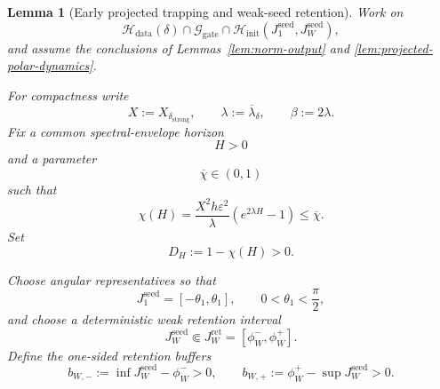 \documentclass{article} %
\theoremstyle{plain}
\newtheorem{lemma}[theorem]{Lemma}
\theoremstyle{definition}
\theoremstyle{remark}
\begin{document}

\begin{lemma}[Early projected trapping and weak-seed retention]
\label{lem:early-projected-trapping}
Work on
\[
\mathcal H_{\mathrm{data}}(\delta)
\cap\mathcal G_{\mathrm{gate}}
\cap
\mathcal H_{\mathrm{init}}
\left(
J_1^{\mathrm{seed}},
J_W^{\mathrm{seed}}
\right),
\]
and assume the conclusions of
Lemmas~\ref{lem:norm-output} and
\ref{lem:projected-polar-dynamics}.

For compactness write
\[
X:=X_{\delta_{\mathrm{strong}}},
\qquad
\lambda:=\overline\lambda_\delta,
\qquad
\beta:=2\lambda.
\]
Fix a common spectral-envelope horizon
\[
H>0
\]
and a parameter
\[
\boxed{\overline\chi\in(0,1)}
\]
such that
\[
\boxed{
\chi(H)
=
\frac{X^2h\varepsilon^2}{\lambda}
\left(e^{2\lambda H}-1\right)
\le
\overline\chi.
}
\]
Set
\[
\boxed{D_H:=1-\chi(H)>0.}
\]

Choose angular representatives so that
\[
J_1^{\mathrm{seed}}
=
[-\theta_1,\theta_1],
\qquad
0<\theta_1<\frac\pi2,
\]
and choose a deterministic weak retention interval
\[
J_W^{\mathrm{seed}}
\Subset
J_W^{\mathrm{ret}}
=
[\phi_W^-,\phi_W^+].
\]
Define the one-sided retention buffers
\[
\boxed{
b_{W,-}
:=
\inf J_W^{\mathrm{seed}}-\phi_W^->0,
\qquad
b_{W,+}
:=
\phi_W^+-\sup J_W^{\mathrm{seed}}>0.
}
\]


\end{lemma}
\end{document}
